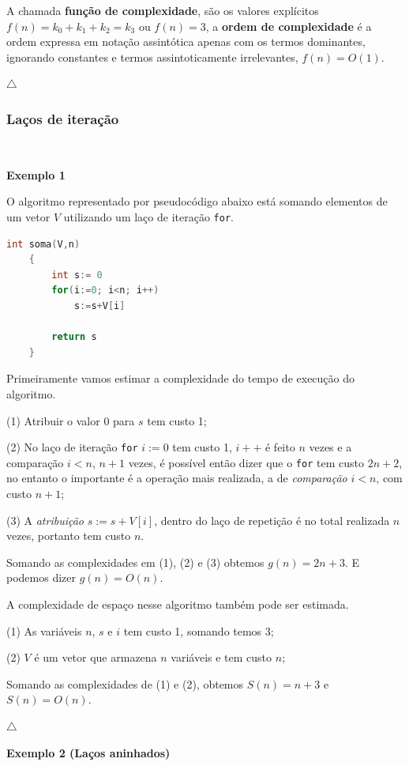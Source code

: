 A chamada \textbf{função de complexidade}, são os valores explícitos $f(n)=k_0+k_1+k_2=k_3$ ou $f(n)=3$, a \textbf{ordem de complexidade} é a ordem expressa em notação assintótica apenas com os termos dominantes, ignorando constantes e termos assintoticamente irrelevantes, $f(n)=O(1)$.

{\raggedleft $\bigtriangleup$ \par}

\subsubsection{Laços de iteração}
\

\textbf{Exemplo 1}

O algoritmo representado por pseudocódigo abaixo está somando elementos de um vetor $V$ utilizando um laço de iteração \texttt{for}.
\begin{lstlisting}[language=C, frame=single]
    int soma(V,n) 
    {
        int s:= 0
        for(i:=0; i<n; i++)
            s:=s+V[i]

        return s
    }
\end{lstlisting}

Primeiramente vamos estimar a complexidade do tempo de execução do algoritmo. 

(1) Atribuir o valor 0 para $s$ tem custo 1; 

(2) No laço de iteração \texttt{for} $i:=0$ tem custo 1, $i++$ é feito $n$ vezes e a comparação $i<n$, $n+1$ vezes, é possível então dizer que o \texttt{for} tem custo $2n+2$, no entanto  o importante é a operação mais realizada, a de \textit{comparação} $i<n$, com custo $n+1$;

(3) A \textit{atribuição} $s:=s+V[i]$, dentro do laço de repetição é no total realizada $n$ vezes, portanto tem custo $n$.

Somando as complexidades em (1), (2) e (3) obtemos $g(n)=2n+3$. E podemos dizer $g(n)=O(n)$.

A complexidade de espaço nesse algoritmo também pode ser estimada.

(1) As variáveis $n$, $s$ e $i$ tem custo 1, somando temos 3;

(2) $V$ é um vetor que armazena $n$ variáveis e tem custo $n$;

Somando as complexidades de (1) e (2), obtemos $S(n)=n+3$ e $S(n)=O(n)$.

{\raggedleft $\bigtriangleup$ \par}

\textbf{Exemplo 2 (Laços aninhados)}

